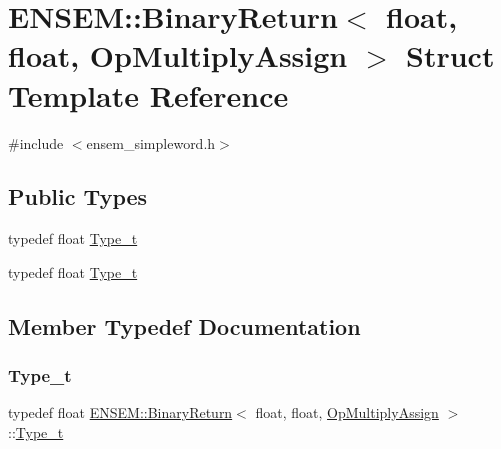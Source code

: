 \hypertarget{structENSEM_1_1BinaryReturn_3_01float_00_01float_00_01OpMultiplyAssign_01_4}{}\section{E\+N\+S\+EM\+:\+:Binary\+Return$<$ float, float, Op\+Multiply\+Assign $>$ Struct Template Reference}
\label{structENSEM_1_1BinaryReturn_3_01float_00_01float_00_01OpMultiplyAssign_01_4}


{\ttfamily \#include $<$ensem\+\_\+simpleword.\+h$>$}

\subsection*{Public Types}
\begin{DoxyCompactItemize}
\item 
typedef float \mbox{\hyperlink{structENSEM_1_1BinaryReturn_3_01float_00_01float_00_01OpMultiplyAssign_01_4_a9d7718a73ef422d2fb14226dbef89f9a}{Type\+\_\+t}}
\item 
typedef float \mbox{\hyperlink{structENSEM_1_1BinaryReturn_3_01float_00_01float_00_01OpMultiplyAssign_01_4_a9d7718a73ef422d2fb14226dbef89f9a}{Type\+\_\+t}}
\end{DoxyCompactItemize}


\subsection{Member Typedef Documentation}
\mbox{\label{structENSEM_1_1BinaryReturn_3_01float_00_01float_00_01OpMultiplyAssign_01_4_a9d7718a73ef422d2fb14226dbef89f9a}} 
\subsubsection{\texorpdfstring{Type\_t}{Type\_t}\hspace{0.1cm}{\footnotesize\ttfamily [1/2]}}
{\footnotesize\ttfamily typedef float \mbox{\hyperlink{structENSEM_1_1BinaryReturn}{E\+N\+S\+E\+M\+::\+Binary\+Return}}$<$ float, float, \mbox{\hyperlink{structENSEM_1_1OpMultiplyAssign}{Op\+Multiply\+Assign}} $>$\+::\mbox{\hyperlink{structENSEM_1_1BinaryReturn_3_01float_00_01float_00_01OpMultiplyAssign_01_4_a9d7718a73ef422d2fb14226dbef89f9a}{Type\+\_\+t}}}

